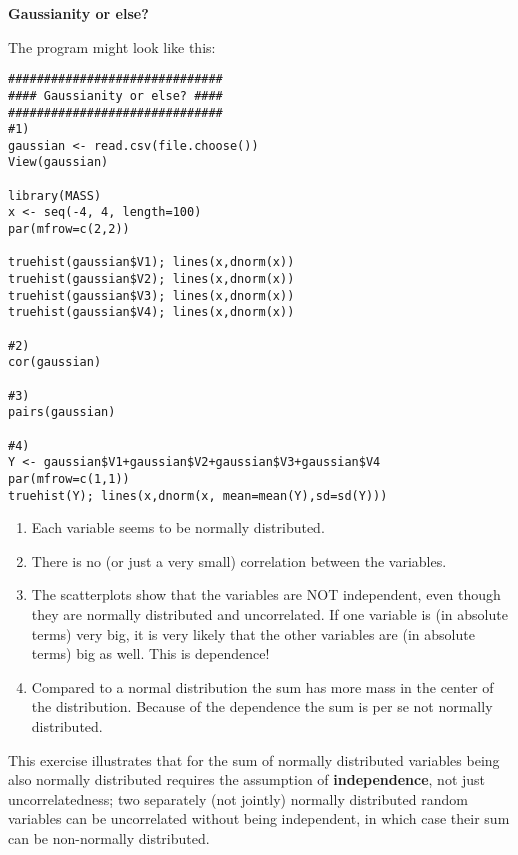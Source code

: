 \begin{Solution}{8.2}
\textbf{Gaussianity or else?}

The program might look like this:
\begin{verbatim}
##############################
#### Gaussianity or else? ####
##############################
#1)
gaussian <- read.csv(file.choose())
View(gaussian)

library(MASS)
x <- seq(-4, 4, length=100)
par(mfrow=c(2,2))

truehist(gaussian$V1); lines(x,dnorm(x))
truehist(gaussian$V2); lines(x,dnorm(x))
truehist(gaussian$V3); lines(x,dnorm(x))
truehist(gaussian$V4); lines(x,dnorm(x))

#2)
cor(gaussian)

#3)
pairs(gaussian)

#4)
Y <- gaussian$V1+gaussian$V2+gaussian$V3+gaussian$V4
par(mfrow=c(1,1))
truehist(Y); lines(x,dnorm(x, mean=mean(Y),sd=sd(Y)))
\end{verbatim}
\begin{enumerate}
  \item Each variable seems to be normally distributed.
  \item There is no (or just a very small) correlation between the
      variables.
  \item The scatterplots show that the variables are NOT independent,
      even though they are normally distributed and uncorrelated. If one
      variable is (in absolute terms) very big, it is very likely that
      the other variables are (in absolute terms) big as well. This is
      dependence!
  \item Compared to a normal distribution the sum has more mass in the
      center of the distribution. Because of the dependence the sum is
      per se not normally distributed.
\end{enumerate}
This exercise illustrates that for the sum of normally distributed variables
being also normally distributed requires the assumption of
\textbf{independence}, not just uncorrelatedness; two separately (not
jointly) normally distributed random variables can be uncorrelated without
being independent, in which case their sum can be non-normally distributed.
\end{Solution}

